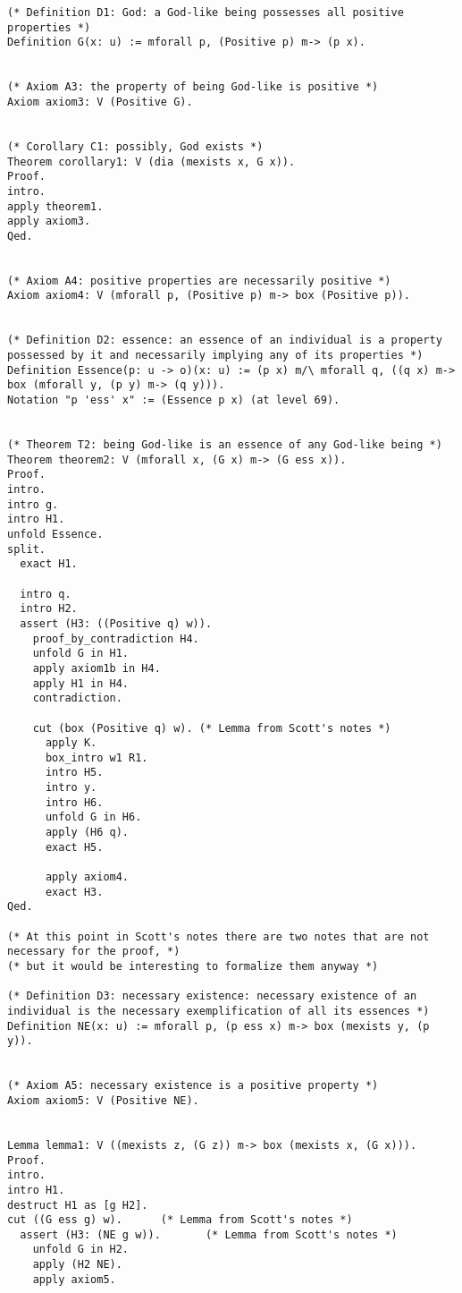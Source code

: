 \documentclass{llncs}
\begin{document}
\begin{verbatim}
(* Definition D1: God: a God-like being possesses all positive properties *)
Definition G(x: u) := mforall p, (Positive p) m-> (p x).


(* Axiom A3: the property of being God-like is positive *)
Axiom axiom3: V (Positive G).


(* Corollary C1: possibly, God exists *)
Theorem corollary1: V (dia (mexists x, G x)). 
Proof.
intro. 
apply theorem1.
apply axiom3.
Qed.


(* Axiom A4: positive properties are necessarily positive *)
Axiom axiom4: V (mforall p, (Positive p) m-> box (Positive p)).


(* Definition D2: essence: an essence of an individual is a property possessed by it and necessarily implying any of its properties *)
Definition Essence(p: u -> o)(x: u) := (p x) m/\ mforall q, ((q x) m-> box (mforall y, (p y) m-> (q y))).
Notation "p 'ess' x" := (Essence p x) (at level 69).


(* Theorem T2: being God-like is an essence of any God-like being *)
Theorem theorem2: V (mforall x, (G x) m-> (G ess x)).
Proof.
intro.
intro g.
intro H1.
unfold Essence.
split.
  exact H1.

  intro q.
  intro H2.
  assert (H3: ((Positive q) w)).
    proof_by_contradiction H4.
    unfold G in H1.
    apply axiom1b in H4.
    apply H1 in H4.
    contradiction. 

    cut (box (Positive q) w). (* Lemma from Scott's notes *)
      apply K.
      box_intro w1 R1.
      intro H5.
      intro y.
      intro H6.
      unfold G in H6.
      apply (H6 q).
      exact H5.

      apply axiom4.
      exact H3.
Qed.

(* At this point in Scott's notes there are two notes that are not necessary for the proof, *)
(* but it would be interesting to formalize them anyway *)

(* Definition D3: necessary existence: necessary existence of an individual is the necessary exemplification of all its essences *)
Definition NE(x: u) := mforall p, (p ess x) m-> box (mexists y, (p y)).


(* Axiom A5: necessary existence is a positive property *)
Axiom axiom5: V (Positive NE).


Lemma lemma1: V ((mexists z, (G z)) m-> box (mexists x, (G x))).
Proof.
intro.
intro H1.
destruct H1 as [g H2].
cut ((G ess g) w).      (* Lemma from Scott's notes *)
  assert (H3: (NE g w)).       (* Lemma from Scott's notes *)
    unfold G in H2.
    apply (H2 NE).
    apply axiom5.


\end{verbatim}
\end{document}
